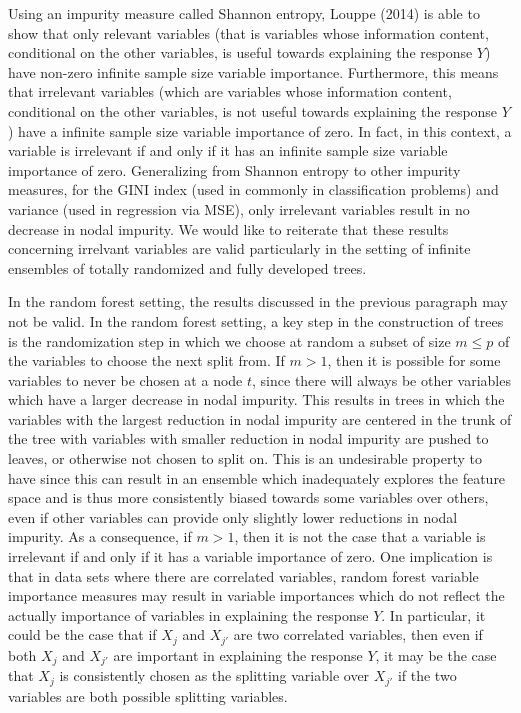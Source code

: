 \documentclass[12pt,twoside]{reedthesis}
\theoremstyle{definition}
\theoremstyle{definition}
\theoremstyle{definition}
\theoremstyle{remark}
\begin{document}
Using an impurity measure called Shannon entropy, Louppe (2014) is able
to show that only relevant variables (that is variables whose
information content, conditional on the other variables, is useful
towards explaining the response \(Y\)) have non-zero infinite sample
size variable importance. Furthermore, this means that irrelevant
variables (which are variables whose information content, conditional on
the other variables, is not useful towards explaining the response
\(Y\)) have a infinite sample size variable importance of zero. In fact,
in this context, a variable is irrelevant if and only if it has an
infinite sample size variable importance of zero. Generalizing from
Shannon entropy to other impurity measures, for the GINI index (used in
commonly in classification problems) and variance (used in regression
via MSE), only irrelevant variables result in no decrease in nodal
impurity. We would like to reiterate that these results concerning
irrelvant variables are valid particularly in the setting of infinite
ensembles of totally randomized and fully developed trees.

In the random forest setting, the results discussed in the previous
paragraph may not be valid. In the random forest setting, a key step in
the construction of trees is the randomization step in which we choose
at random a subset of size \(m\leq p\) of the variables to choose the
next split from. If \(m>1\), then it is possible for some variables to
never be chosen at a node \(t\), since there will always be other
variables which have a larger decrease in nodal impurity. This results
in trees in which the variables with the largest reduction in nodal
impurity are centered in the trunk of the tree with variables with
smaller reduction in nodal impurity are pushed to leaves, or otherwise
not chosen to split on. This is an undesirable property to have since
this can result in an ensemble which inadequately explores the feature
space and is thus more consistently biased towards some variables over
others, even if other variables can provide only slightly lower
reductions in nodal impurity. As a consequence, if \(m>1\), then it is
not the case that a variable is irrelevant if and only if it has a
variable importance of zero. One implication is that in data sets where
there are correlated variables, random forest variable importance
measures may result in variable importances which do not reflect the
actually importance of variables in explaining the response \(Y\). In
particular, it could be the case that if \(X_j\) and \(X_{j'}\) are two
correlated variables, then even if both \(X_j\) and \(X_{j'}\) are
important in explaining the response \(Y\), it may be the case that
\(X_j\) is consistently chosen as the splitting variable over \(X_{j'}\)
if the two variables are both possible splitting variables.
\end{document}
